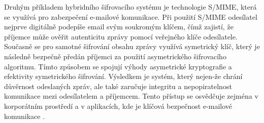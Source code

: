 Druhým příkladem hybridního šifrovacího systému je technologie S/MIME, která se využívá pro zabezpečení e-mailové komunikace. Při použití S/MIME odesílatel nejprve digitálně podepíše email svým soukromým klíčem, čímž zajistí, že příjemce může ověřit autenticitu zprávy pomocí veřejného klíče odesílatele. Současně se pro samotné šifrování obsahu zprávy využívá symetrický klíč, který je následně bezpečně předán příjemci za použití asymetrického šifrovacího algoritmu. Tímto způsobem se spojují výhody asymetrické kryptografie a efektivity symetrického šifrování.
Výsledkem je systém, který nejen-že chrání důvěrnost odeslaných zpráv, ale také zaručuje integritu a nepopiratelnost komunikace mezi odesílatelem a příjemcem. Tento přístup se osvědčuje zejména v korporátním prostředí a v aplikacích, kde je klíčová bezpečnost e-mailové komunikace \parencite{cloudflare2024}.


\newpage